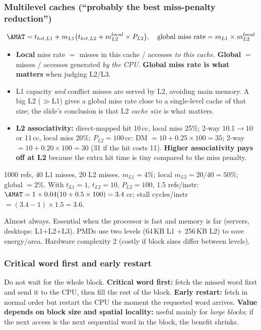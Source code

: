 \subsubsection{Multilevel caches (``probably the best miss-penalty reduction'')}
\[
\AMAT=t_{hit,L1}+m_{L1}\big(t_{hit,L2}+m_{L2}^{local}\times P_{L2}\big),\quad
\text{global miss rate}=m_{L1}\times m_{L2}^{local}
\]
\begin{itemize}
\item \textbf{Local} miss rate $=$ misses in this cache / accesses \emph{to this cache}. \textbf{Global} $=$ misses / accesses generated \emph{by the CPU}. \textbf{Global miss rate is what matters} when judging L2/L3.
\item L1 capacity \emph{and} conflict misses are served by L2, avoiding main memory. A big L2 ($\gg$L1) gives a global miss rate close to a single-level cache of that size; the slide's conclusion is that L2 \emph{cache size} is what matters.
\item \textbf{L2 associativity:} direct-mapped hit 10\,cc, local miss 25\%; 2-way 10.1$\to$10 or 11\,cc, local miss 20\%; $P_{L2}=100$\,cc: DM $=10+0.25\times100=35$; 2-way $=10+0.20\times100=30$ (31 if the hit costs 11). \textbf{Higher associativity pays off at L2} because the extra hit time is tiny compared to the miss penalty.
\end{itemize}
\begin{ex}
1000 refs, 40 L1 misses, 20 L2 misses. $m_{L1}=4\%$; local $m_{L2}=20/40=50\%$; global $=2\%$. With $t_{L1}=1$, $t_{L2}=10$, $P_{L2}=100$, 1.5 refs/instr: $\AMAT=1+0.04(10+0.5\times100)=3.4$\,cc; stall cycles/instr $=(3.4-1)\times1.5=3.6$.
\end{ex}
\begin{pick}
Almost always. Essential when the processor is fast and memory is far (servers, desktops: L1+L2+L3). PMDs use two levels (64\,KB L1 + 256\,KB L2) to save energy/area. Hardware complexity 2 (costly if block sizes differ between levels).
\end{pick}

\subsubsection{Critical word first and early restart}
Do not wait for the whole block. \textbf{Critical word first:} fetch the missed word first and send it to the CPU, then fill the rest of the block. \textbf{Early restart:} fetch in normal order but restart the CPU the moment the requested word arrives. \textbf{Value depends on block size and spatial locality:} useful mainly for \emph{large blocks}; if the next access is the next sequential word in the block, the benefit shrinks.

